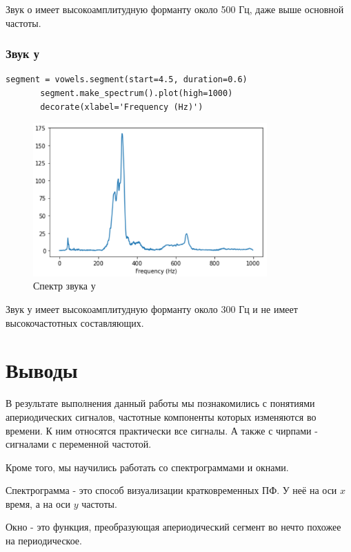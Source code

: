 \documentclass[a4paper,12pt]{report}
\begin{document}
    Звук о имеет высокоамплитудную форманту около 500 Гц, даже выше основной частоты.

\subsection{Звук у}
\begin{lstlisting}[caption=Получение спектра звука у]
       segment = vowels.segment(start=4.5, duration=0.6)
       segment.make_spectrum().plot(high=1000)
       decorate(xlabel='Frequency (Hz)')
\end{lstlisting}
\begin{figure}[H]
        \centering
        \includegraphics[width=0.8\textwidth]{fig6-6.PNG}
        \caption{Спектр звука у}
        \label{fig:fig6-6}
\end{figure}

    Звук у имеет высокоамплитудную форманту около 300 Гц и не имеет высокочастотных составляющих.
\chapter{Выводы}
    В результате выполнения данный работы мы познакомились с понятиями апериодических сигналов, частотные компоненты которых изменяются во времени. К ним относятся практически все сигналы. А также с чирпами - сигналами с переменной частотой.
    
    Кроме того, мы научились работать со спектрограммами и окнами. 
    
    Спектрограмма - это способ визуализации кратковременных ПФ. У неё на оси $x$ время, а на оси $y$ частоты.
    
    Окно - это функция, преобразующая апериодический сегмент во нечто похожее на периодическое.   
\end{document}
